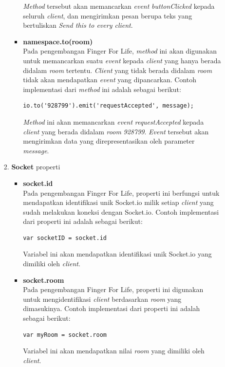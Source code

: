\begin{enumerate}
\begin{enumerate}
\begin{enumerate}
\begin{itemize}
\textit{Method} tersebut akan memancarkan \textit{event} \textit{buttonClicked} kepada seluruh \textit{client}, dan mengirimkan pesan berupa teks yang bertuliskan \textit{Send this to every client}.
				
				\item \textbf{namespace.to(room)} \\
				Pada pengembangan Finger For Life, \textit{method} ini akan digunakan untuk memancarkan suatu \textit{event} kepada \textit{client} yang hanya berada didalam \textit{room} tertentu. \textit{Client} yang tidak berada didalam \textit{room} tidak akan mendapatkan \textit{event} yang dipancarkan. Contoh implementasi dari \textit{method} ini adalah sebagai berikut:

\begin{lstlisting}
io.to('928799').emit('requestAccepted', message);
\end{lstlisting}
\textit{Method} ini akan memancarkan \textit{event} \textit{requestAccepted} kepada \textit{client} yang berada didalam \textit{room} \textit{928799}. \textit{Event} tersebut akan mengirimkan data yang direpresentasikan oleh parameter \textit{message}.

			\end{itemize}
		
			\item \textbf{Socket}
			properti
			\begin{itemize}
				\item \textbf{socket.id} \\
				Pada pengembangan Finger For Life, properti ini berfungsi untuk mendapatkan identifikasi unik Socket.io milik setiap \textit{client} yang sudah melakukan koneksi dengan Socket.io. Contoh implementasi dari properti ini adalah sebagai berikut:
\begin{lstlisting}
var socketID = socket.id
\end{lstlisting}
Variabel ini akan mendapatkan identifikasi unik Socket.io yang dimiliki oleh \textit{client}. 
				
				\item \textbf{socket.room} \\
				Pada pengembangan Finger For Life, properti ini digunakan untuk mengidentifikasi \textit{client} berdasarkan \textit{room} yang dimasukinya. Contoh implementasi dari properti ini adalah sebagai berikut:
\begin{lstlisting}
var myRoom = socket.room
\end{lstlisting}
Variabel ini akan mendapatkan nilai \textit{room} yang dimiliki oleh \textit{client}.


\end{itemize}
\end{enumerate}
\end{enumerate}
\end{enumerate}
